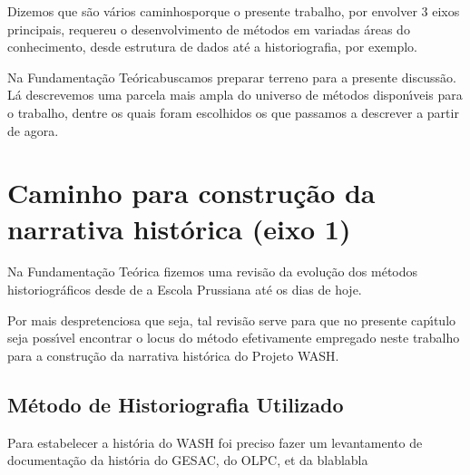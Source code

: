 \documentclass[
12pt,		%
openright,	%
twoside,  %
a4paper,			%
chapter=TITLE,		%
english,			%
french,				%
spanish,			%
brazil				%
]{USPSC-classe/USPSC}
\begin{document}
Dizemos que s\~ao \textquotedbl v\'arios caminhos\textquotedbl  porque o presente trabalho, por envolver 3 eixos principais, requereu o desenvolvimento de m\'etodos em variadas \'areas do conhecimento, desde estrutura de dados at\'e a historiografia, por exemplo.














Na \textquotedbl Fundamenta\c{c}\~ao Te\'orica\textquotedbl  buscamos preparar terreno para a presente discuss\~ao. L\'a descrevemos uma parcela mais ampla do universo de m\'etodos dispon\'{\i}veis para o trabalho, dentre os quais foram escolhidos os que passamos a descrever a partir de agora.














\section[Caminho para constru\c{c}\~ao da narrativa hist\'orica (eixo 1)]{Caminho para constru\c{c}\~ao da narrativa hist\'orica (eixo 1)}\label{Caminho para constru\c{c}\~ao da narrativa hist\'orica (eixo 1)}
Na Fundamenta\c{c}\~ao Te\'orica fizemos uma revis\~ao da evolu\c{c}\~ao dos m\'etodos historiogr\'aficos desde de a Escola Prussiana at\'e os dias de hoje.














Por mais despretenciosa que seja, tal revis\~ao serve para que no presente cap\'{\i}tulo seja poss\'{\i}vel encontrar o locus do m\'etodo efetivamente empregado neste trabalho para a constru\c{c}\~ao da narrativa hist\'orica do Projeto WASH.














\subsection[M\'etodo de Historiografia Utilizado ]{M\'etodo de Historiografia Utilizado }\label{M\'etodo de Historiografia Utilizado }
Para estabelecer a hist\'oria do WASH foi preciso fazer um levantamento de documenta\c{c}\~ao da hist\'oria do GESAC, do OLPC, et da blablabla
\end{document}
